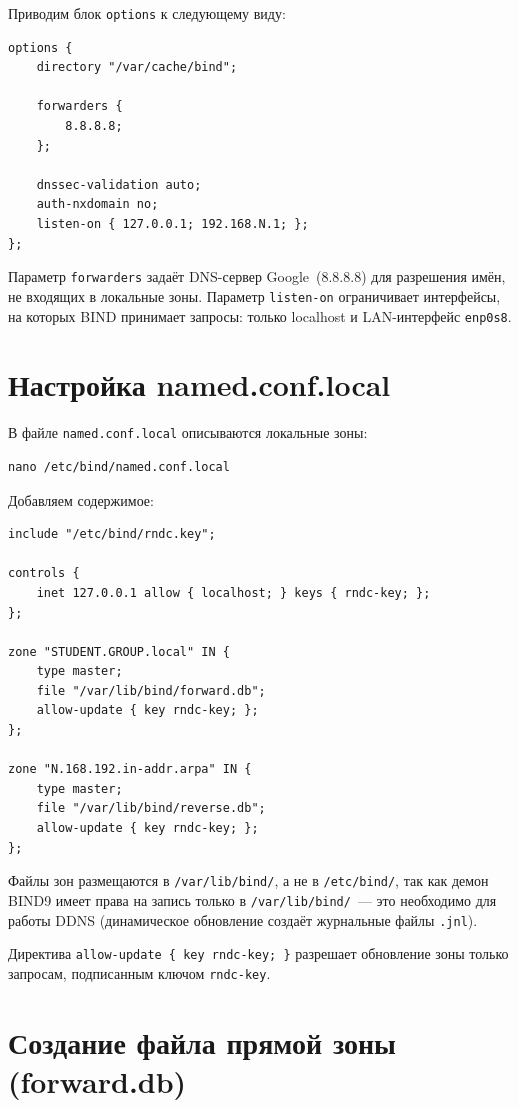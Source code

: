 \documentclass[a4paper,14pt,oneside,openany]{memoir}
\begin{document}
Приводим блок \texttt{options} к следующему виду:
\begin{lstlisting}
options {
    directory "/var/cache/bind";

    forwarders {
        8.8.8.8;
    };

    dnssec-validation auto;
    auth-nxdomain no;
    listen-on { 127.0.0.1; 192.168.N.1; };
};
\end{lstlisting}

Параметр \texttt{forwarders} задаёт DNS-сервер Google~(8.8.8.8) для разрешения имён, не входящих в локальные зоны. Параметр \texttt{listen-on} ограничивает интерфейсы, на которых BIND принимает запросы: только localhost и LAN-интерфейс \texttt{enp0s8}.

\section{Настройка named.conf.local}

В файле \texttt{named.conf.local} описываются локальные зоны:
\begin{lstlisting}
nano /etc/bind/named.conf.local
\end{lstlisting}

Добавляем содержимое:
\begin{lstlisting}
include "/etc/bind/rndc.key";

controls {
    inet 127.0.0.1 allow { localhost; } keys { rndc-key; };
};

zone "STUDENT.GROUP.local" IN {
    type master;
    file "/var/lib/bind/forward.db";
    allow-update { key rndc-key; };
};

zone "N.168.192.in-addr.arpa" IN {
    type master;
    file "/var/lib/bind/reverse.db";
    allow-update { key rndc-key; };
};
\end{lstlisting}

Файлы зон размещаются в \texttt{/var/lib/bind/}, а не в \texttt{/etc/bind/}, так как демон BIND9 имеет права на запись только в \texttt{/var/lib/bind/}~--- это необходимо для работы DDNS (динамическое обновление создаёт журнальные файлы \texttt{.jnl}).

Директива \texttt{allow-update~\{~key~rndc-key;~\}} разрешает обновление зоны только запросам, подписанным ключом \texttt{rndc-key}.

\section{Создание файла прямой зоны (forward.db)}
\end{document}
